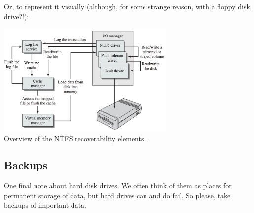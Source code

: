 Or, to represent it visually (although, for some strange reason, with a floppy disk drive?!):

\begin{center}
	\includegraphics[width=0.65\textwidth]{images/ntfs-overview.png}\\
	Overview of the NTFS recoverability elements~\cite{osi}.
\end{center}

\subsection*{Backups}

One final note about hard disk drives. We often think of them as places for permanent storage of data, but hard drives can and do fail. So please, take backups of important data.



